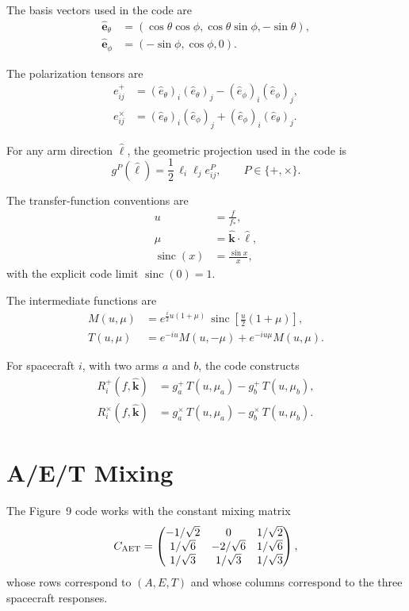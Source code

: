 \documentclass[11pt]{article}
\begin{document}
The basis vectors used in the code are
\begin{align}
\hat{\mathbf{e}}_\theta &=
(\cos\theta\cos\phi,\cos\theta\sin\phi,-\sin\theta), \\
\hat{\mathbf{e}}_\phi &=
(-\sin\phi,\cos\phi,0).
\end{align}

The polarization tensors are
\begin{align}
e^+_{ij} &= (\hat e_\theta)_i(\hat e_\theta)_j-(\hat e_\phi)_i(\hat e_\phi)_j, \\
e^\times_{ij} &= (\hat e_\theta)_i(\hat e_\phi)_j+(\hat e_\phi)_i(\hat e_\theta)_j.
\end{align}

For any arm direction $\hat{\ell}$, the geometric projection used in the code is
\begin{equation}
g^P(\hat{\ell}) = \frac{1}{2}\,\ell_i \ell_j e^P_{ij},
\qquad
P\in\{+,\times\}.
\end{equation}

The transfer-function conventions are
\begin{align}
u &= \frac{f}{f_*}, \\
\mu &= \hat{\mathbf{k}}\cdot \hat{\ell}, \\
\operatorname{sinc}(x) &= \frac{\sin x}{x},
\end{align}
with the explicit code limit $\operatorname{sinc}(0)=1$.

The intermediate functions are
\begin{align}
M(u,\mu) &= e^{\frac{i}{2}u(1+\mu)} \, \operatorname{sinc}\!\left[\frac{u}{2}(1+\mu)\right], \\
T(u,\mu) &= e^{-iu} M(u,-\mu) + e^{-iu\mu} M(u,\mu).
\end{align}

For spacecraft $i$, with two arms $a$ and $b$, the code constructs
\begin{align}
R_i^+(f,\hat{\mathbf{k}}) &= g_a^+\,T(u,\mu_a)-g_b^+\,T(u,\mu_b), \\
R_i^\times(f,\hat{\mathbf{k}}) &= g_a^\times\,T(u,\mu_a)-g_b^\times\,T(u,\mu_b).
\end{align}

\section{A/E/T Mixing}
The Figure~9 code works with the constant mixing matrix
\begin{equation}
C_{\rm AET} =
\begin{pmatrix}
-1/\sqrt{2} & 0 & 1/\sqrt{2} \\
1/\sqrt{6} & -2/\sqrt{6} & 1/\sqrt{6} \\
1/\sqrt{3} & 1/\sqrt{3} & 1/\sqrt{3}
\end{pmatrix},
\end{equation}
whose rows correspond to $(A,E,T)$ and whose columns correspond to the three spacecraft responses.
\end{document}
